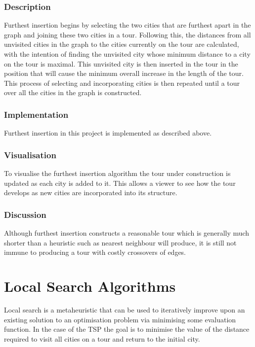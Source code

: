 \documentclass{l4proj}
\begin{document}
\subsubsection{Description}
\label{fi_desc}
Furthest insertion begins by selecting the two cities that are furthest apart in the graph and joining these two cities in a tour. Following this, the distances from all unvisited cities in the graph to the cities currently on the tour are calculated, with the intention of finding the unvisited city whose minimum distance to a city on the tour is maximal. This unvisited city is then inserted in the tour in the position that will cause the minimum overall increase in the length of the tour. This process of selecting and incorporating cities is then repeated until a tour over all the cities in the graph is constructed. 

\subsubsection{Implementation}
Furthest insertion in this project is implemented as described above.

\subsubsection{Visualisation}
To visualise the furthest insertion algorithm the tour under construction is updated as each city is added to it. This allows a viewer to see how the tour develops as new cities are incorporated into its structure.


\subsubsection{Discussion}
Although furthest insertion constructs a reasonable tour which is generally much shorter than a heuristic such as nearest neighbour will produce, it is still not immune to producing a tour with costly crossovers of edges.


\section{Local Search Algorithms}
Local search is a metaheuristic that can be used to iteratively improve upon an existing solution to an optimisation problem via minimising some evaluation function. In the case of the TSP the goal is to minimise the value of the distance required to visit all cities on a tour and return to the initial city.
\end{document}
